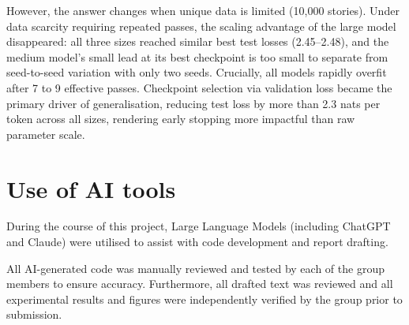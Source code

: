 \documentclass[12pt]{article}
\begin{document}
However, the answer changes when unique data is limited (10,000 stories). Under data scarcity requiring repeated passes, the scaling advantage of the large model disappeared: all three sizes reached similar best test losses (2.45--2.48), and the medium model's small lead at its best checkpoint is too small to separate from seed-to-seed variation with only two seeds. Crucially, all models rapidly overfit after 7 to 9 effective passes. Checkpoint selection via validation loss became the primary driver of generalisation, reducing test loss by more than 2.3 nats per token across all sizes, rendering early stopping more impactful than raw parameter scale.

\section*{Use of AI tools}
During the course of this project, Large Language Models (including ChatGPT and Claude) were utilised to assist with code development and report drafting.

All AI-generated code was manually reviewed and tested by each of the group members to ensure accuracy. Furthermore, all drafted text was reviewed and all experimental results and figures were independently verified by the group prior to submission.

%
%

\end{document}
